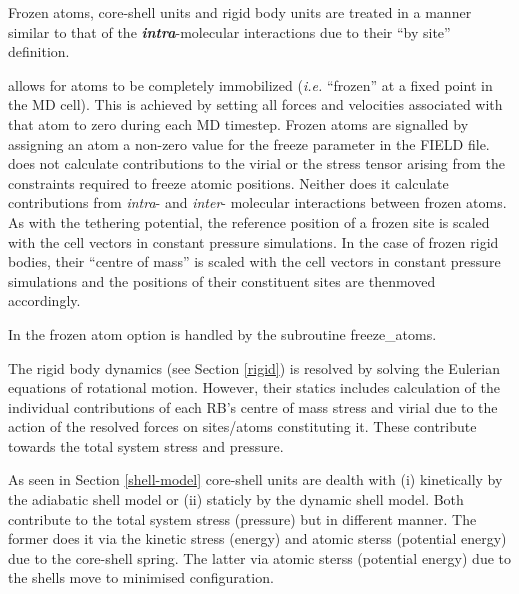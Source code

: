 Frozen atoms, core-shell units and rigid body units are treated in a
manner similar to that of the {\em \bf intra}-molecular interactions due to
their ``by site'' definition.

\D allows for atoms to be completely immobilized ({\em i.e.}
``frozen'' at a fixed point in the MD cell).  This is achieved by
setting all forces and velocities associated with that atom to
zero during each MD timestep.  Frozen atoms are signalled by
assigning an atom a non-zero value for the freeze parameter in the
FIELD file.  \D does not calculate contributions to the virial or
the stress tensor arising from the
constraints required to freeze atomic positions.  Neither does it
calculate contributions from {\em intra}- and {\em inter}- molecular
interactions between frozen atoms.  As with the tethering
potential, the reference position of a frozen site is scaled with
the cell vectors in constant pressure simulations.  In the case of
frozen rigid bodies, their ``centre of mass'' is scaled with
the cell vectors in constant pressure simulations and the positions
of their constituent sites are thenmoved accordingly.

In \D the frozen atom option is handled by the subroutine {\sc freeze\_atoms}.

The rigid body dynamics (see Section \ref{rigid}) is resolved by
solving the Eulerian equations of rotational motion.
However, their statics includes calculation of the individual
contributions of each RB's centre of mass stress and virial
due to the action of the resolved forces on sites/atoms constituting it.
These contribute towards the total system stress and pressure.

As seen in Section \ref{shell-model} core-shell units
are dealth with (i) kinetically by the adiabatic shell model or (ii)
staticly by the dynamic shell model.  Both contribute to the total
system stress (pressure) but in different manner.  The former does
it via the kinetic stress (energy) and atomic sterss (potential
energy) due to the core-shell spring.  The latter via atomic sterss (potential
energy) due to the shells move to minimised configuration.
